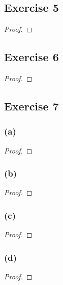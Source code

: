 \documentclass[14pt]{extarticle}
\begin{document}
\subsection{Exercise 5}

\begin{proof}

\end{proof}

\subsection{Exercise 6}

\begin{proof}

\end{proof}

\subsection{Exercise 7}

\subsubsection{(a)}

\begin{proof}

\end{proof}

\subsubsection{(b)}

\begin{proof}

\end{proof}

\subsubsection{(c)}

\begin{proof}

\end{proof}

\subsubsection{(d)}

\begin{proof}

\end{proof}
\end{document}
